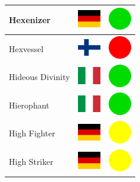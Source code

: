 \documentclass[12pt, a4paper, twoside]{report}
\begin{document}
\begin{center}
\begin{longtable}{|p{5cm}|p{2cm}|p{2cm}|}
 Hexenizer                                                  & \includegraphics[width=1cm]{../img/flags/de} &   \includegraphics[width=1cm]{../likes/y} \\ \hline
 Hexvessel                                                  & \includegraphics[width=1cm]{../img/flags/fi} &   \includegraphics[width=1cm]{../likes/n} \\ \hline
 Hideous Divinity                                           & \includegraphics[width=1cm]{../img/flags/it} &   \includegraphics[width=1cm]{../likes/y} \\ \hline
 Hierophant                                                 & \includegraphics[width=1cm]{../img/flags/it} &   \includegraphics[width=1cm]{../likes/y} \\ \hline
 High Fighter                                               & \includegraphics[width=1cm]{../img/flags/de} &   \includegraphics[width=1cm]{../likes/m} \\ \hline
 High Striker                                               & \includegraphics[width=1cm]{../img/flags/de} &   \includegraphics[width=1cm]{../likes/m} \\ \hline

\end{longtable}
\end{center}
\end{document}
